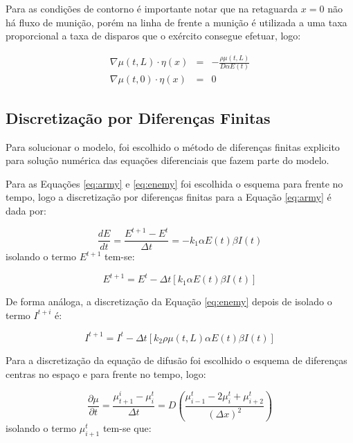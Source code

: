 \documentclass{article}
\begin{document}
Para as condições de contorno é importante notar que na retaguarda $x=0$ não há fluxo de munição, porém na linha de frente a munição é utilizada a uma taxa proporcional a taxa de disparos que o exército consegue efetuar, logo:

\begin{eqnarray}
	\nabla \mu(t,L) \cdot \eta(x) &=& -\frac{\rho \mu(t,L)}{D \alpha E(t)} \\
	\nabla \mu(t,0) \cdot \eta(x) &=& 0 \nonumber
\end{eqnarray}

\subsection{Discretização por Diferenças Finitas}

Para solucionar o modelo, foi escolhido o método de diferenças finitas explicito para solução numérica das equações diferenciais que fazem parte do modelo.

Para as Equações \ref{eq:army} e \ref{eq:enemy} foi escolhida o esquema para frente no tempo, logo a discretização por diferenças finitas para a Equação \ref{eq:army} é dada por:

\begin{equation}
	\frac{dE}{dt} = \frac{E^{t+1} - E^t}{\Delta t} = -k_1 \alpha E(t) \beta I(t)
\end{equation}
isolando o termo $E^{t+1}$ tem-se:

\begin{equation}
	E^{t+1} = E^t - \Delta t \left[k_1 \alpha E(t) \beta I(t) \right]
\end{equation}

De forma análoga, a discretização da Equação \ref{eq:enemy} depois de isolado o termo $I^{t+i}$ é:

\begin{equation}
	I^{t+1} = I^{t} - \Delta t \left[ k_2 \rho \mu(t,L) \alpha E(t) \beta I(t) \right]
\end{equation}

Para a discretização da equação de difusão foi escolhido o esquema de diferenças centras no espaço e para frente no tempo, logo:

\begin{equation}
	\frac{\partial \mu}{\partial t} = \frac{\mu_{t+1}^{i} - \mu_i^t}{\Delta t} = D \left( \frac{\mu_{i-1}^t - 2\mu_i^t + \mu_{i+2}^{t}}{( \Delta x)^2 } \right)
\end{equation}
isolando o termo $\mu_{i+1}^t$ tem-se que:
\end{document}

